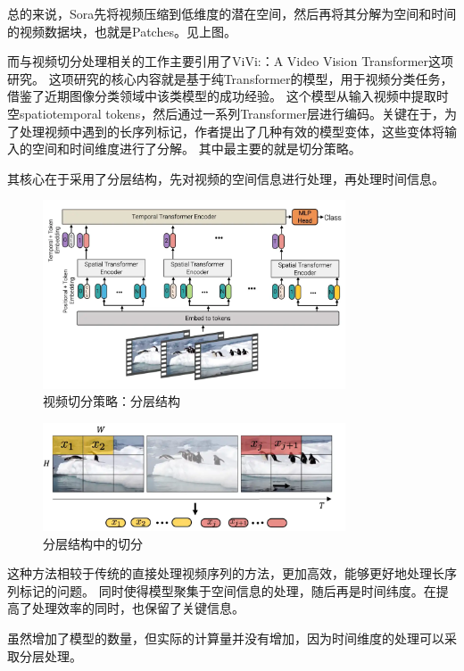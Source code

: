 \documentclass[12pt,a4paper,oneside]{article}
\begin{document}
总的来说，Sora先将视频压缩到低维度的潜在空间，然后再将其分解为空间和时间的视频数据块，也就是Patches。见上图。


而与视频切分处理相关的工作主要引用了ViVi:：A Video Vision Transformer这项研究。
这项研究的核心内容就是基于纯Transformer的模型，用于视频分类任务，借鉴了近期图像分类领域中该类模型的成功经验。
这个模型从输入视频中提取时空spatiotemporal tokens，然后通过一系列Transformer层进行编码。关键在于，为了处理视频中遇到的长序列标记，作者提出了几种有效的模型变体，这些变体将输入的空间和时间维度进行了分解。
其中最主要的就是切分策略。

其核心在于采用了分层结构，先对视频的空间信息进行处理，再处理时间信息。
\begin{figure}[h] 
    \centering 
    \includegraphics[width=0.8\textwidth]{3.png} 
    \caption{视频切分策略：分层结构} 
    \label{Fig.main3} 
\end{figure}


\begin{figure}[h] 
    \centering 
    \includegraphics[width=0.8\textwidth]{4.png} 
    \caption{分层结构中的切分} 
    \label{Fig.main4} 
\end{figure}
这种方法相较于传统的直接处理视频序列的方法，更加高效，能够更好地处理长序列标记的问题。
同时使得模型聚集于空间信息的处理，随后再是时间纬度。在提高了处理效率的同时，也保留了关键信息。

虽然增加了模型的数量，但实际的计算量并没有增加，因为时间维度的处理可以采取分层处理。
\end{document}
